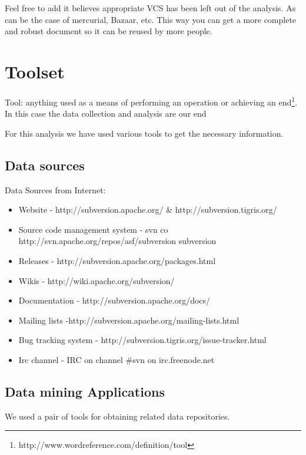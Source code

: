 \documentclass[11pt]{scrartcl}
\begin{document}
\par Feel free to add it believes appropriate VCS has been left out of the analysis. As can be the case of mercurial, Bazaar, etc. This way you can get a more complete and robust document so it can be reused by more people.

\section{Toolset}

\par Tool: anything used as a means of performing an operation or achieving an end\footnote{http://www.wordreference.com/definition/tool}. In this case the data collection and analysis are our end

\par For this analysis we have used various tools to get the necessary information.

\subsection{Data sources}

Data Sources from Internet:

\begin{itemize}
    \item Website - http://subversion.apache.org/ \& http://subversion.tigris.org/
    \item Source code management system - svn co http://svn.apache.org/repos/asf/subversion subversion
    \item Releases - http://subversion.apache.org/packages.html
    \item Wikis - http://wiki.apache.org/subversion/
    \item Documentation - http://subversion.apache.org/docs/
    \item Mailing lists -http://subversion.apache.org/mailing-lists.html
    \item Bug tracking system - http://subversion.tigris.org/issue-tracker.html
    \item Irc channel - IRC on channel \#svn on irc.freenode.net
\end{itemize}

\subsection{Data mining Applications}

We used a pair of tools for obtaining related data repositories.
\end{document}
